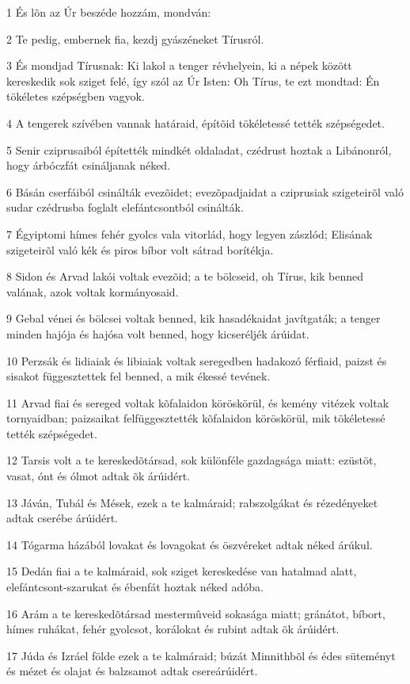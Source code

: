 \par 1 És lõn az Úr beszéde hozzám, mondván:
\par 2 Te pedig, embernek fia, kezdj gyászéneket Tírusról.
\par 3 És mondjad Tírusnak: Ki lakol a tenger révhelyein, ki a népek között kereskedik sok sziget felé, így szól az Úr Isten: Oh Tírus, te ezt mondtad: Én tökéletes szépségben vagyok.
\par 4 A tengerek szívében vannak határaid, építõid tökéletessé tették szépségedet.
\par 5 Senir cziprusaiból építették mindkét oldaladat, czédrust hoztak a Libánonról, hogy árbóczfát csináljanak néked.
\par 6 Básán cserfáiból csinálták evezõidet; evezõpadjaidat a cziprusiak szigeteirõl való sudar czédrusba foglalt elefántcsontból csinálták.
\par 7 Égyiptomi hímes fehér gyolcs vala vitorlád, hogy legyen zászlód; Elisának szigeteirõl való kék és piros bíbor volt sátrad borítékja.
\par 8 Sidon és Arvad lakói voltak evezõid; a te bölcseid, oh Tírus, kik benned valának, azok voltak kormányosaid.
\par 9 Gebal vénei és bölcsei voltak benned, kik hasadékaidat javítgaták; a tenger minden hajója és hajósa volt benned, hogy kicseréljék árúidat.
\par 10 Perzsák és lidiaiak és libiaiak voltak seregedben hadakozó férfiaid, paizst és sisakot függesztettek fel benned, a mik ékessé tevének.
\par 11 Arvad fiai és sereged voltak kõfalaidon köröskörül, és kemény vitézek voltak tornyaidban; paizsaikat felfüggesztették kõfalaidon köröskörül, mik tökéletessé tették szépségedet.
\par 12 Tarsis volt a te kereskedõtársad, sok különféle gazdagsága miatt: ezüstöt, vasat, ónt és ólmot adtak õk árúidért.
\par 13 Jáván, Tubál és Mések, ezek a te kalmáraid; rabszolgákat és rézedényeket adtak cserébe árúidért.
\par 14 Tógarma házából lovakat és lovagokat és öszvéreket adtak néked árúkul.
\par 15 Dedán fiai a te kalmáraid, sok sziget kereskedése van hatalmad alatt, elefántcsont-szarukat és ébenfát hoztak néked adóba.
\par 16 Arám a te kereskedõtársad mestermûveid sokasága miatt; gránátot, bíbort, hímes ruhákat, fehér gyolcsot, korálokat és rubint adtak õk árúidért.
\par 17 Júda és Izráel földe ezek a te kalmáraid; búzát Minnithbõl és édes süteményt és mézet és olajat és balzsamot adtak csereárúidért.
